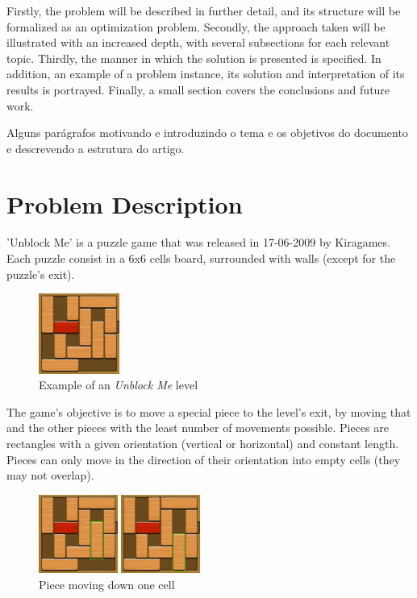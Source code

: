 \documentclass[conference]{IEEEtran}
\begin{document}
Firstly, the problem will be described in further detail, and its structure will be formalized as an optimization problem. Secondly, the approach taken will be illustrated with an increased depth, with several subsections for each relevant topic. Thirdly, the manner in which the solution is presented is specified. In addition, an example of a problem instance, its solution and interpretation of its results is portrayed. Finally, a small section covers the conclusions and future work.

Alguns parágrafos motivando e introduzindo o tema e os objetivos do documento e descrevendo a estrutura do artigo.

\section{Problem Description}
'Unblock Me' is a puzzle game that was released in 17-06-2009 by Kiragames. Each puzzle consist in a 6x6 cells board, surrounded with walls (except for the puzzle's exit). 

\begin{figure}[H]
    \centerline{\includegraphics[width=100px]{img1.png}}
    \caption{Example of an \textit{Unblock Me} level}
    \label{fig}
\end{figure}

The game's objective is to move a special piece to the level's exit, by moving that and the other pieces with the least number of movements possible. Pieces are rectangles with a given orientation (vertical or horizontal) and constant length. Pieces can only move in the direction of their orientation into empty cells (they may not overlap).  

\begin{figure}[H]
    \centerline{\includegraphics[width=200px]{img2.png}}
    \caption{Piece moving down one cell}
    \label{fig}
\end{figure}
\end{document}
